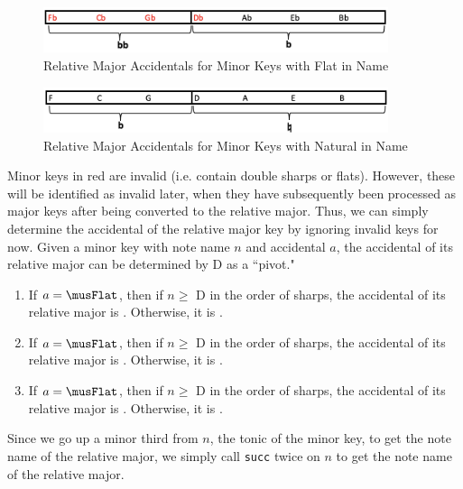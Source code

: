 \documentclass{report}
\begin{document}
\begin{figure}[h!]
\centering
\includegraphics[width=0.9\textwidth]{images/flat_min_to_maj}
\caption{Relative Major Accidentals for Minor Keys with Flat in Name}
\label{major_flat}
\end{figure}

\begin{figure}[h!]
\centering
\includegraphics[width=0.9\textwidth]{images/natural_min_to_maj}
\caption{Relative Major Accidentals for Minor Keys with Natural in Name}
\label{major_flat}
\end{figure}

Minor keys in red are invalid (i.e. contain double sharps or flats). However, these will be identified as invalid later, when they have subsequently been processed as major keys after being converted to the relative major. Thus, we can simply determine the accidental of the relative major key by ignoring invalid keys for now. Given a minor key with note name $n$ and accidental $a$, the accidental of its relative major can be determined by D as a ``pivot." 

\begin{enumerate}
\item If $a=\musFlat$, then if $n \geq$ D in the order of sharps, the accidental of its relative major is \musSharp. Otherwise, it is \musNatural.
\item If $a=\musFlat$, then if $n \geq$ D in the order of sharps, the accidental of its relative major is \musFlat. Otherwise, it is \musDoubleFlat.
\item If $a=\musFlat$, then if $n \geq$ D in the order of sharps, the accidental of its relative major is \musNatural. Otherwise, it is \musFlat.
\end{enumerate}

Since we go up a minor third from $n$, the tonic of the minor key, to get  the note name of the relative major, we simply call \verb.succ. twice on $n$ to get the note name of the relative major.

\end{document}
